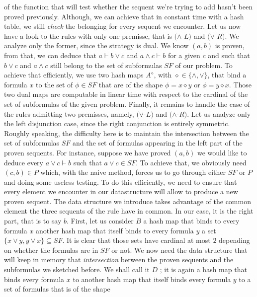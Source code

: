 \documentclass[a4paper, 11pt]{article}
\begin{document}
    of the function that will test whether the sequent we're trying to add hasn't been proved previously.
    Although, we can achieve that in constant time with a hash table, we still \textit{check} the 
    belonging for every sequent we encounter. %
    Let us now have a look to the rules with only
    one premisse, that is $(\wedge$-$L)$ and $(\vee$-$R)$. We analyze only the former, since the strategy
    is dual. We know $(a,b)$ is proven, from that, we can deduce that $a\vdash b\vee c$ and 
    $a\wedge c\vdash b$ for a given $c$ and such that $b\vee c$ and $a\wedge c$ still belong to the set 
    of subformulas $SF$ of our problem. To achieve that efficiently, we use two hash maps $A^\diamond$,
    with $\diamond\in\{\wedge,\vee\}$, that bind a formula $x$ to the set of $\phi\in SF$ that are of
    the shape $\phi=x\diamond y$ or $\phi=y\diamond x$. Those two dual maps are computable in linear time
    with respect to the cardinal of the set of subformulas of the given problem. Finally, it remains to
    handle the case of the rules admitting two premisses, namely, $(\vee$-$L)$ and $(\wedge$-$R)$. Let us
    analyze only the left disjunction case, since the right conjunction is entirely symmetric. Roughly
    speaking, the difficulty here is to maintain the intersection between the set of subformulas $SF$
    and the set of formulas appearing in the left part of the proven sequents. For instance, suppose
    we have proved $(a,b)$ we would like to deduce every $a\vee c\vdash b$ such that $a\vee c\in SF$.
    To achieve that, we obviously need $(c,b)\in P$ which, with the naive method, forces us to go through
    either $SF$ or $P$ and doing some useless testing. To do this efficiently, we need to ensure that
    every element we encounter in our datastructure will allow to produce a new proven sequent. The
    data structure we introduce takes advantage of the common element the three sequents of the rule
    have in common. In our case, it is the right part, that is to say $b$. First, let us consider 
    $B$ a hash map that binds to every formula $x$ another hash map that itself binds to every 
    formula $y$ a set $\{x\vee y,y\vee x\}\subseteq SF$. It is clear that those sets have cardinal at 
    most $2$ depending on whether the formulas are in $SF$ or not. We now need the data structure that
    will keep in memory that \textit{intersection} between the proven sequents and the subformulas we
    sketched before. We shall call it $D$ ; it is again a hash map that binds every formula $x$ to
    another hash map that itself binds every formula $y$ to a set of formulas that is of the shape
\end{document}
